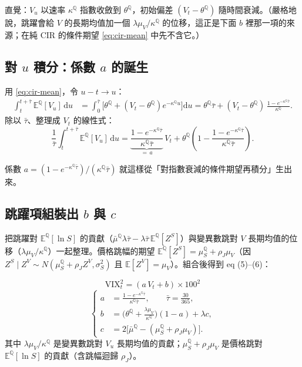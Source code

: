 \documentclass[12pt, a4paper]{article}
\theoremstyle{remark}
\newcommand{\E}{\mathbb{E}}
\newcommand{\Q}{\mathbb{Q}}
\newcommand{\dd}{\mathrm{d}}
\newcommand{\VIX}{\mathrm{VIX}}
\begin{document}
直覺：$V_u$ 以速率 $\kappa^\Q$ 指數收斂到 $\theta^\Q$，初始偏差 $(V_t-\theta^\Q)$ 隨時間衰減。（嚴格地說，跳躍會給 $V$ 的長期均值加一個 $\lambda\mu_V/\kappa^\Q$ 的位移，這正是下面 $b$ 裡那一項的來源；在純 CIR 的條件期望 \eqref{eq:cir-mean} 中先不含它。）

\subsection{對 $u$ 積分：係數 $a$ 的誕生}

\begin{derivbox}
用 \eqref{eq:cir-mean}，令 $u-t\to u$：
\begin{align*}
  \int_t^{t+\bar\tau}\!\E^\Q[V_u]\,\dd u
  &= \int_0^{\bar\tau}\!\Big[\theta^\Q + (V_t-\theta^\Q)e^{-\kappa^\Q u}\Big]\dd u
  = \theta^\Q\bar\tau + (V_t-\theta^\Q)\,\frac{1-e^{-\kappa^\Q\bar\tau}}{\kappa^\Q}.
\end{align*}
除以 $\bar\tau$、整理成 $V_t$ 的線性式：
\[
  \frac{1}{\bar\tau}\int_t^{t+\bar\tau}\!\E^\Q[V_u]\,\dd u
  = \underbrace{\frac{1-e^{-\kappa^\Q\bar\tau}}{\kappa^\Q\bar\tau}}_{=\,a}\,V_t
  + \theta^\Q\!\left(1-\frac{1-e^{-\kappa^\Q\bar\tau}}{\kappa^\Q\bar\tau}\right).
\]
\end{derivbox}

係數 $a=(1-e^{-\kappa^\Q\bar\tau})/(\kappa^\Q\bar\tau)$ 就這樣從「對指數衰減的條件期望再積分」生出來。

\subsection{跳躍項組裝出 $b$ 與 $c$}

把跳躍對 $\E^\Q[\ln S]$ 的貢獻（$\bar\mu^\Q\lambda\bar\tau - \lambda\bar\tau\,\E^\Q[Z^S]$）與變異數跳對 $V$ 長期均值的位移（$\lambda\mu_V/\kappa^\Q$）一起整理。價格跳幅的期望 $\E^\Q[Z^S]=\mu_S^\Q+\rho_J\mu_V$（因 $Z^S\mid Z^V\sim N(\mu_S^\Q+\rho_J Z^V,\sigma_S^2)$ 且 $\E[Z^V]=\mu_V$）。組合後得到 eq (5)--(6)：

\begin{keybox}[title={eq (5)--(6)：第一根樑}]
\begin{equation}
  \boxed{\ \VIX_t^2 = (a\,V_t + b)\times 100^2\ }
  \tag{5}
\end{equation}
\begin{equation}
  \left\{
  \begin{aligned}
    a &= \frac{1-e^{-\kappa^\Q\bar\tau}}{\kappa^\Q\bar\tau}, \qquad \bar\tau = \frac{30}{365},\\[2pt]
    b &= \Big(\theta^\Q + \frac{\lambda\mu_V}{\kappa^\Q}\Big)(1-a) + \lambda c,\\[2pt]
    c &= 2\big[\bar\mu^\Q - (\mu_S^\Q + \rho_J\mu_V)\big].
  \end{aligned}
  \right.
  \tag{6}
\end{equation}
其中 $\lambda\mu_V/\kappa^\Q$ 是變異數跳對 $V_u$ 長期均值的貢獻；$\mu_S^\Q+\rho_J\mu_V$ 是價格跳對 $\E^\Q[\ln S]$ 的貢獻（含跳幅迴歸 $\rho_J$）。
\end{keybox}
\end{document}
